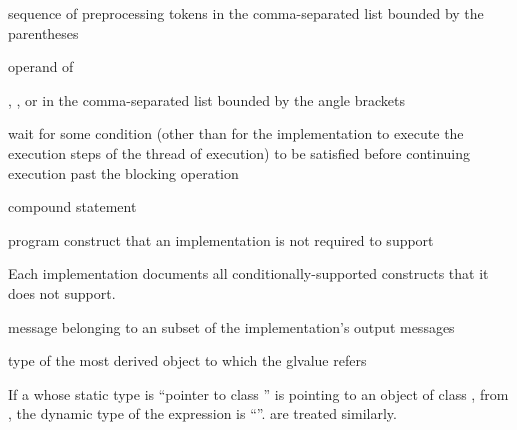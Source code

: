 %
%
 sequence of preprocessing tokens in the
comma-separated list bounded by the parentheses

%
%
 operand of 

%
%
,
, or
 in the comma-separated
list bounded by the angle brackets

%
wait for some condition (other than for the implementation to execute
the execution steps of the thread of execution) to be satisfied before
continuing execution past the blocking operation

%
compound statement

%
program construct that an implementation is not required to support

\begin{defnote}
Each implementation documents all conditionally-supported
constructs that it does not support.
\end{defnote}

%
message belonging to an  subset of the
implementation's output messages

%
 type of the most derived object to which the
glvalue refers

\begin{example}
If a   whose static type is ``pointer to
class '' is pointing to an object of class ,
from , the dynamic type of the
expression  is ``''.  are
treated similarly.
\end{example}

